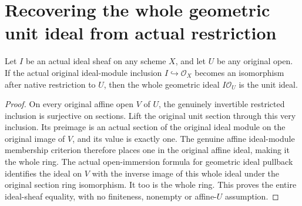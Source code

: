 \section{Recovering the whole geometric unit ideal from actual restriction}

\begin{lemma}
\label{lem:ideal-module-restriction-unit}
\leanok
{}
Let $I$ be an actual ideal sheaf on any scheme $X$, and let $U$
be any original open. If the actual original ideal-module inclusion
$I\hookrightarrow\mathcal O_X$ becomes an isomorphism after
native restriction to $U$, then the whole geometric ideal
$I\mathcal O_U$ is the unit ideal.
\end{lemma}
\begin{proof}
On every original affine open $V$ of $U$, the genuinely invertible
restricted inclusion is surjective on sections. Lift the original
unit section through this very inclusion. Its preimage is an actual
section of the original ideal module on the original image of $V$,
and its value is exactly one. The genuine affine ideal-module
membership criterion therefore places one in the original affine
ideal, making it the whole ring. The actual open-immersion formula
for geometric ideal pullback identifies the ideal on $V$ with
the inverse image of this whole ideal under the original section
ring isomorphism. It too is the whole ring. This proves the entire
ideal-sheaf equality, with no finiteness, nonempty or affine-$U$
assumption.
\end{proof}
